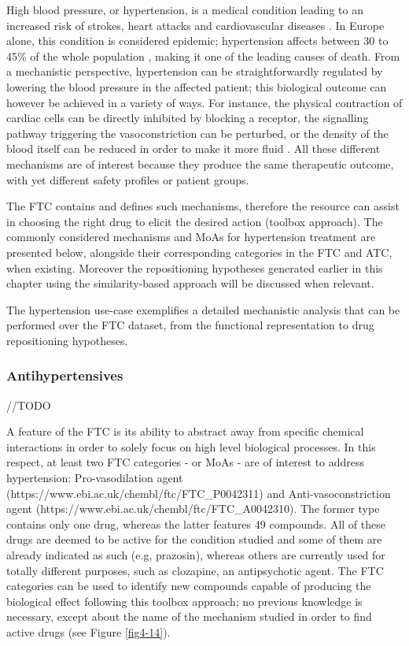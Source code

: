 High blood pressure, or hypertension, is a medical condition leading to an increased risk of strokes, heart attacks and cardiovascular diseases \citep{law2003lowering}. In Europe alone, this condition is considered epidemic; hypertension affects between 30 to 45\% of the whole population \citep{swedberg2005task}, making it one of the leading causes of death. From a mechanistic perspective, hypertension can be straightforwardly regulated by lowering the blood pressure in the affected patient; this biological outcome can however be achieved in a variety of ways. For instance, the physical contraction of cardiac cells can be directly inhibited by blocking a receptor, the signalling pathway triggering the vasoconstriction can be perturbed, or the density of the blood itself can be reduced in order to make it more fluid \citep{swedberg2005task}. All these different mechanisms are of interest because they produce the same therapeutic outcome, with yet different safety profiles or patient groups.

The FTC contains and defines such mechanisms, therefore the resource can assist in choosing the right drug to elicit the desired action (toolbox approach). The commonly considered mechanisms and MoAs for hypertension treatment are presented below, alongside their corresponding categories in the FTC and ATC, when existing. Moreover the repositioning hypotheses generated earlier in this chapter using the similarity-based approach will be discussed when relevant.

The hypertension use-case exemplifies a detailed mechanistic analysis that can be performed over the FTC dataset, from the functional representation to drug repositioning hypotheses.

\subsubsection{Antihypertensives}

//TODO

A feature of the FTC is its ability to abstract away from specific chemical interactions in order to solely focus on high level biological processes. In this respect, at least two FTC categories - or MoAs - are of interest to address hypertension: Pro-vasodilation agent (https://www.ebi.ac.uk/chembl/ftc/FTC\_P0042311) and Anti-vasoconstriction agent (https://www.ebi.ac.uk/chembl/ftc/FTC\_A0042310). The former type contains only one drug, whereas the latter features 49 compounds. All of these drugs are deemed to be active for the condition studied and some of them are already indicated as such (e.g, prazosin), whereas others are currently used for totally different purposes, such as clozapine, an antipsychotic agent. The FTC categories can be used to identify new compounds capable of producing the biological effect following this toolbox approach; no previous knowledge is necessary, except about the name of the mechanism studied in order to find active drugs (see Figure \ref{fig4-14}).

